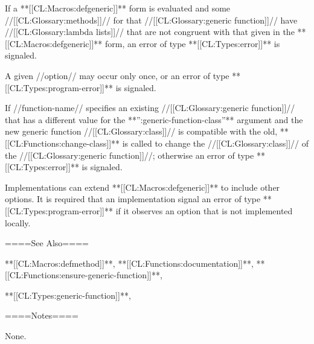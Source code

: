 If a **[[CL:Macros:defgeneric]]** form is evaluated and some //[[CL:Glossary:methods]]// for that //[[CL:Glossary:generic function]]// have //[[CL:Glossary:lambda lists]]// that are not congruent with that given in the **[[CL:Macros:defgeneric]]** form, an error of type **[[CL:Types:error]]** is signaled.

A given //option// may occur only once, or an error of type **[[CL:Types:program-error]]** is signaled.

 If //function-name// specifies an existing //[[CL:Glossary:generic function]]// that has a different value for the **'':generic-function-class''** argument and the new generic function //[[CL:Glossary:class]]// is compatible with the old, **[[CL:Functions:change-class]]** is called to change the //[[CL:Glossary:class]]// of the //[[CL:Glossary:generic function]]//; otherwise an error of type **[[CL:Types:error]]** is signaled.

Implementations can extend **[[CL:Macros:defgeneric]]** to include other options. It is required that an implementation signal an error of type **[[CL:Types:program-error]]** if it observes an option that is not implemented locally.

====See Also====

**[[CL:Macros:defmethod]]**, **[[CL:Functions:documentation]]**, **[[CL:Functions:ensure-generic-function]]**,

**[[CL:Types:generic-function]]**,{\secref\GFMethodLambdaListCongruency}

====Notes====

None.


     

